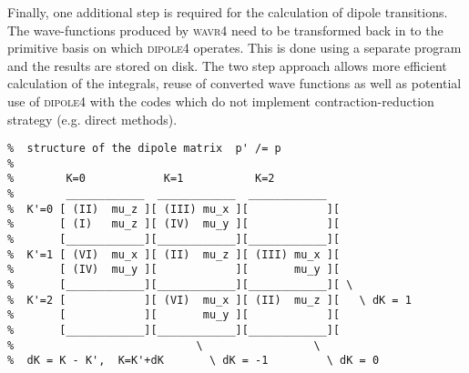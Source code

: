Finally, one additional step is required for the calculation of dipole transitions.
The wave-functions produced by \textsc{wavr4} need to be transformed
back in to the primitive basis on which \textsc{dipole4} operates.
This is done using a separate program and the results are stored on disk. 
The two step approach allows more efficient calculation of the integrals, 
reuse of converted wave functions as well as potential use of \textsc{dipole4} 
with the codes which do not implement contraction-reduction strategy 
(e.g. direct methods).

\begin{verbatim}
%  structure of the dipole matrix  p' /= p
%
%        K=0            K=1           K=2
%        ____________  ____________  ____________
%  K'=0 [ (II)  mu_z ][ (III) mu_x ][            ][
%       [ (I)   mu_z ][ (IV)  mu_y ][            ][
%       [____________][____________][____________][
%  K'=1 [ (VI)  mu_x ][ (II)  mu_z ][ (III) mu_x ][
%       [ (IV)  mu_y ][            ][       mu_y ][
%       [____________][____________][____________][ \
%  K'=2 [            ][ (VI)  mu_x ][ (II)  mu_z ][   \ dK = 1
%       [            ][       mu_y ][            ][
%       [____________][____________][____________][
%                            \                 \ 
%  dK = K - K',  K=K'+dK       \ dK = -1         \ dK = 0
\end{verbatim}

